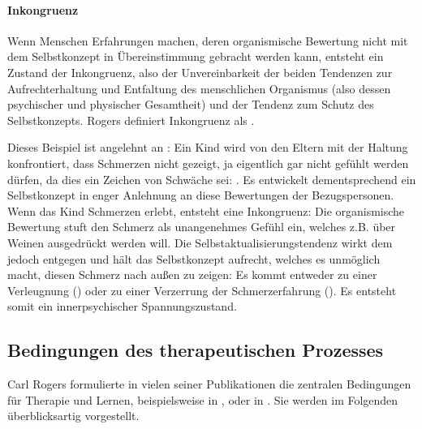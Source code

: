 \documentclass[
  twoside,
  parskip=half-,
]{scrreprt}
\begin{document}
\paragraph{Inkongruenz} Wenn Menschen Erfahrungen machen, deren organismische Bewertung nicht mit dem Selbstkonzept in Übereinstimmung gebracht werden kann, entsteht ein Zustand der Inkongruenz, also der Unvereinbarkeit der beiden Tendenzen zur Aufrechterhaltung und Entfaltung des menschlichen Organismus (also dessen psychischer und physischer Gesamtheit) und der Tendenz zum Schutz des Selbstkonzepts. Rogers definiert Inkongruenz als  . 

\begin{beispiel}
  Dieses Beispiel ist angelehnt an \textcite[26]{weinberger}: Ein Kind wird von den Eltern mit der Haltung konfrontiert, dass Schmerzen nicht gezeigt, ja eigentlich gar nicht gefühlt werden dürfen, da dies ein Zeichen von Schwäche sei: . Es entwickelt dementsprechend ein Selbstkonzept in enger Anlehnung an diese Bewertungen der Bezugspersonen. Wenn das Kind Schmerzen erlebt, entsteht eine Inkongruenz: Die organismische Bewertung stuft den Schmerz als unangenehmes Gefühl ein, welches z.B. über Weinen ausgedrückt werden will. Die Selbstaktualisierungstendenz wirkt dem jedoch entgegen und hält das Selbstkonzept aufrecht, welches es unmöglich macht, diesen Schmerz nach außen zu zeigen:  Es kommt entweder zu einer Verleugnung () oder zu einer Verzerrung der Schmerzerfahrung (). Es entsteht somit ein innerpsychischer Spannungszustand.
\end{beispiel}

\subsection{Bedingungen des therapeutischen Prozesses}

Carl Rogers formulierte in vielen seiner Publikationen die zentralen Bedingungen für Therapie und Lernen, beispielsweise in ,  oder in . Sie werden im Folgenden überblicksartig vorgestellt. 
\end{document}
